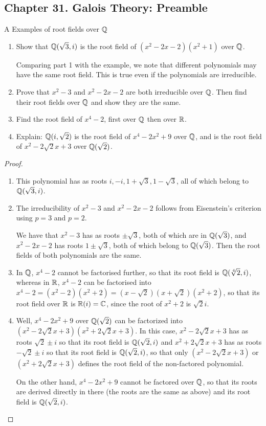 \subsection*{Chapter 31. Galois Theory: Preamble}


\begin{exercise}{A Examples of root fields over $\mathbb{Q}$}
\begin{enumerate}
    \item Show that $\mathbb{Q}(\sqrt{3},i)$ is the root field of $(x^2-2x-2)(x^2+1)$ over $\mathbb{Q}$.

    Comparing part 1 with the example, we note that different polynomials may have the same root field. This is true even if the polynomials are irreducible.
    \item Prove that $x^2-3$ and $x^2-2x-2$ are both irreducible over $\mathbb{Q}$. Then find their root fields over $\mathbb{Q}$ and show they are the same.
    \item Find the root field of $x^4-2$, first over $\mathbb{Q}$ then over $\mathbb{R}$.
    \item Explain: $\mathbb{Q}(i,\sqrt{2})$ is the root field of $x^4-2x^2+9$ over $\mathbb{Q}$, and is the root field of $x^2-2\sqrt{2}x+3$ over $\mathbb{Q}(\sqrt{2})$.
\end{enumerate}
\end{exercise}
\begin{proof}
 \begin{enumerate}
     \item This polynomial has as roots $i, -i, 1+\sqrt{3}, 1-\sqrt{3}$, all of which belong to $\mathbb{Q}(\sqrt{3}, i)$.
     \item The irreducibility of $x^2-3$ and $x^2-2x-2$ follows from Eisenstein's criterion using $p=3$ and $p=2$.

     We have that $x^2-3$ has as roots $\pm\sqrt{3}$, both of which are in $\mathbb{Q}(\sqrt{3})$, and $x^2-2x-2$ has roots $1\pm\sqrt{3}$, both of which belong to $\mathbb{Q}(\sqrt{3})$. Then the root fields of both polynomials are the same.
     \item In $\mathbb{Q}$, $x^4-2$ cannot be factorised further, so that its root field is $\mathbb{Q}(\sqrt[4]{2},i)$, whereas in $\mathbb{R}$, $x^4-2$ can be factorised into $x^4-2=(x^2-2)(x^2+2)=(x-\sqrt{2})(x+\sqrt{2})(x^2+2)$, so that its root field over $\mathbb{R}$ is $\mathbb{R}(i)=\mathbb{C}$, since the root of $x^2+2$ is $\sqrt{2}i$.
     \item Well, $x^4-2x^2+9$ over $\mathbb{Q}(\sqrt{2})$ can be factorized into $(x^2-2\sqrt{2}x+3)(x^2+2\sqrt{2}x+3)$. In this case, $x^2-2\sqrt{2}x+3$ has as roots $\sqrt{2}\pm i$ so that its root field is $\mathbb{Q}(\sqrt{2}, i)$ and $x^2+2\sqrt{2}x+3$ has as roots $-\sqrt{2}\pm i$ so that its root field is $\mathbb{Q}(\sqrt{2},i)$, so that only $(x^2-2\sqrt{2}x+3)$ or $(x^2+2\sqrt{2}x+3)$ defines the root field of the non-factored polynomial. 

     On the other hand, $x^4-2x^2+9$ cannot be factored over $\mathbb{Q}$, so that its roots are derived directly in there (the roots are the same as above) and its root field is $\mathbb{Q}(\sqrt{2},i)$.
 \end{enumerate}
\end{proof}

